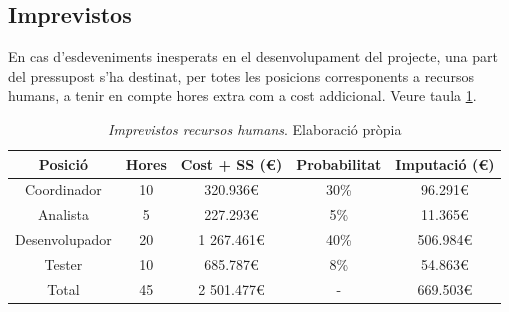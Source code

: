 \documentclass[a4paper]{article} %
\begin{document}
	\subsection{Imprevistos}\label{section:imprevistos}
	En cas d'esdeveniments inesperats en el desenvolupament del projecte, una part del pressupost s'ha destinat, per totes les posicions corresponents a recursos humans, a tenir en compte hores extra com a cost addicional. Veure taula \ref{table:imprevistosRH}.
	\begin{table}[h!]
		\hspace*{-.5cm}
		\centering
		\begin{tabular}{|| c || c | c || c | c||}
			\hline
			\textbf{Posició} & \textbf{Hores} & \textbf{Cost + SS (\euro)} & \textbf{Probabilitat} & \textbf{Imputació (\euro)} \\
			\hline \hline
			Coordinador & 10 & 320.936\euro & 30\% & 96.291\euro \\
			Analista & 5 & 227.293\euro & 5\% & 11.365\euro \\
			Desenvolupador & 20 & 1 267.461\euro & 40\% & 506.984\euro\\
			Tester & 10 &  685.787\euro & 8\% & 54.863\euro \\
			\hline \hline
			Total & 45 & 2 501.477\euro & - & 669.503\euro \\
			\hline
		\end{tabular}
		\caption[\textit{Imprevistos RRHH}]{\textit{\small Imprevistos recursos humans}. Elaboració pròpia}
		\label{table:imprevistosRH}
	\end{table}
\end{document}
